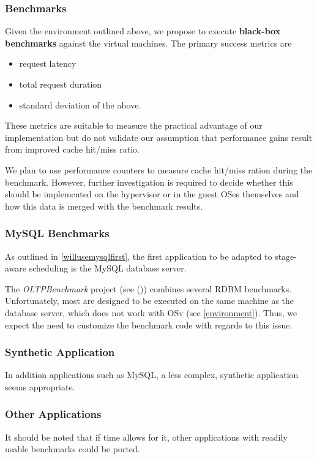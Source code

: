 \documentclass{article}
\begin{document}
\subsubsection{Benchmarks}

Given the environment outlined above, we propose to execute \textbf{black-box benchmarks} against the virtual machines.
The primary success metrics are
\begin{itemize}
    \item request latency
    \item total request duration
    \item standard deviation of the above.
\end{itemize}

These metrics are suitable to measure the practical advantage of our implementation but
do not validate our assumption that performance gains result from improved cache hit/miss ratio.

We plan to use performance counters to measure cache hit/miss ration during the benchmark.
However, further investigation is required to decide whether this should be implemented on the hypervisor or in the guest OSes themselves
and how this data is merged with the benchmark results.

\subsubsection{MySQL Benchmarks}

As outlined in \ref{willusemysqlfirst}, the first application to be adapted to stage-aware scheduling is the MySQL database server.

The \textit{OLTPBenchmark} project (see (\cite{oltpbench})) combines several RDBM benchmarks.
Unfortunately, most are designed to be executed on the same machine as the database server, which does not work with OSv (see \ref{environment}).
Thus, we expect the need to customize the benchmark code with regards to this issue.

\subsubsection{Synthetic Application}

In addition applications such as MySQL, a less complex, synthetic application seems appropriate.

\subsubsection{Other Applications}

It should be noted that if time allows for it, other applications with readily usable benchmarks could be ported.

\clearpage

\printglossaries

\clearpage


\end{document}
